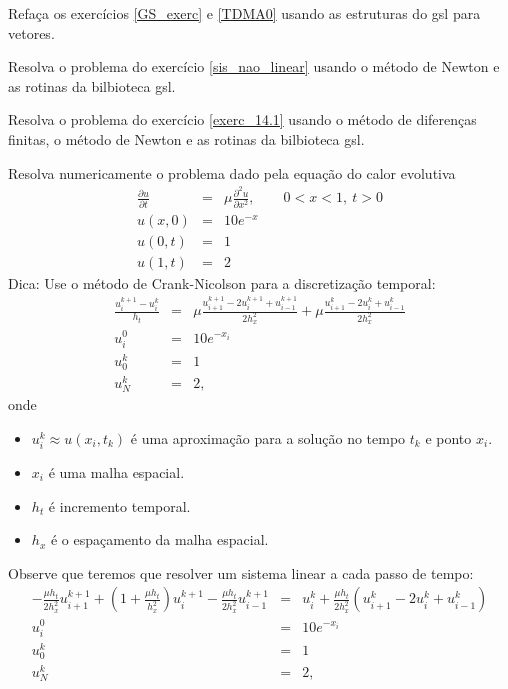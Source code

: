 \begin{exer}
Refaça os exercícios \ref{GS_exerc} e \ref{TDMA0} usando as estruturas do gsl para vetores.
\end{exer}

\begin{exer}Resolva o problema do exercício \ref{sis_nao_linear} usando o método de Newton e as rotinas da bilbioteca gsl.
\end{exer}
\begin{exer}
Resolva o problema do exercício \ref{exerc_14.1} usando o método de diferenças finitas, o método de Newton e as rotinas da bilbioteca gsl.
\end{exer}
\begin{exer}
Resolva numericamente o problema dado pela equação do calor evolutiva
\begin{eqnarray*}
\frac{\partial u}{\partial t}&=&\mu\frac{\partial^2 u}{\partial x^2},\qquad 0<x<1,\ t>0\\
u(x,0)&=&10e^{-x}\\
u(0,t)&=&1\\
u(1,t)&=&2
\end{eqnarray*}
Dica: Use o método de Crank-Nicolson para a discretização temporal:
\begin{eqnarray*}
\frac{u^{k+1}_i-u^{k}_i}{h_t}&=&\mu\frac{u^{k+1}_{i+1}-2u^{k+1}_i+u^{k+1}_{i-1}}{2h_x^2}+\mu\frac{u^{k}_{i+1}-2u^{k}_i+u^{k}_{i-1}}{2h_x^2}\\
u_i^0&=&10e^{-x_i}\\
u_0^{k}&=&1\\
u_N^{k}&=&2,
\end{eqnarray*}
onde
\begin{itemize}
 \item $u^k_i\approx u(x_i,t_k)$ é uma aproximação para a solução no tempo $t_k$ e ponto $x_i$.
 \item $x_i$ é uma malha espacial.
 \item $h_t$ é incremento temporal.
 \item $h_x$ é o espaçamento da malha espacial.
\end{itemize}
Observe que teremos que resolver um sistema linear a cada passo de tempo:
\begin{eqnarray*}
-\frac{\mu h_t}{2h_x^2}u^{k+1}_{i+1}+\left(1+\frac{\mu h_t}{h_x^2}\right)u^{k+1}_i-\frac{\mu h_t}{2h_x^2}u^{k+1}_{i-1}&=&u^{k}_i+\frac{\mu h_t}{2h_x^2}\left(u^{k}_{i+1}-2u^{k}_i+u^{k}_{i-1}\right)\\
u_i^0&=&10e^{-x_i}\\
u_0^{k}&=&1\\
u_N^{k}&=&2,
\end{eqnarray*}
\end{exer}


